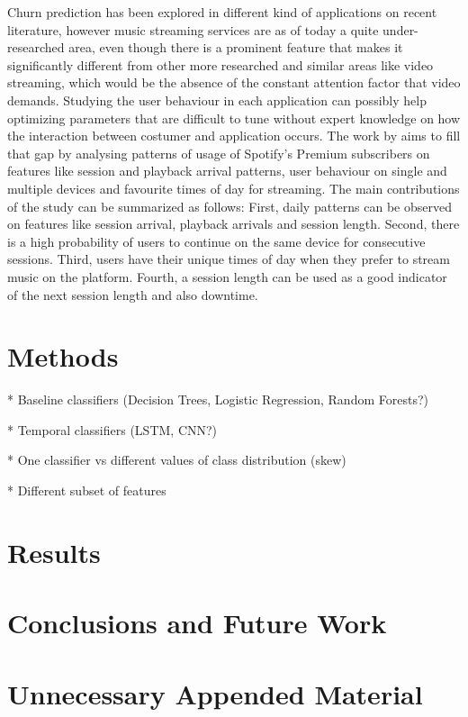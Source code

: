 \documentclass{kththesis}
\begin{document}
Churn prediction has been explored in different kind of applications on recent literature, however music streaming services are as of today a quite under-researched area, even though there is a prominent feature that makes it significantly different from other more researched and similar areas like video streaming, which would be the absence of the constant attention factor that video demands. Studying the user behaviour in each application can possibly help optimizing parameters that are difficult to tune without expert knowledge on how the interaction between costumer and application occurs. The work by \citep{Zhang2013} aims to fill that gap by analysing patterns of usage of Spotify's Premium subscribers on features like session and playback arrival patterns, user behaviour on single and multiple devices and favourite times of day for streaming. The main contributions of the study can be summarized as follows: First, daily patterns can be observed on features like session arrival, playback arrivals and session length. Second, there is a high probability of users to continue on the same device for consecutive sessions. Third, users have their unique times of day when they prefer to stream music on the platform. Fourth, a session length can be used as a good indicator of the next session length and also downtime.


\chapter{Methods}

* Baseline classifiers (Decision Trees, Logistic Regression, Random Forests?)

* Temporal classifiers (LSTM, CNN?)

* One classifier vs different values of class distribution (skew)

* Different subset of features


\chapter{Results}

\lipsum

\chapter{Conclusions and Future Work}

\lipsum[5]



\appendix

\chapter{Unnecessary Appended Material}
\end{document}
